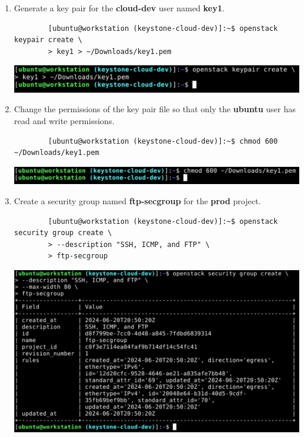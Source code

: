 \documentclass[letterpaper, 12pt]{article}
\begin{document}
\begin{enumerate}
    \item Generate a key pair for the \textbf{cloud-dev} user named \textbf{key1}.
    \begin{lstlisting}
        [ubuntu@workstation (keystone-cloud-dev)]:~$ openstack keypair create \
        > key1 > ~/Downloads/key1.pem
    \end{lstlisting}

    \begin{center}
        \includegraphics[width=\linewidth]{images/part1/step30.png}
    \end{center}

    \item Change the permissions of the key pair file so that only the \textbf{ubuntu} user has read and write permissions.
    \begin{lstlisting}
        [ubuntu@workstation (keystone-cloud-dev)]:~$ chmod 600 ~/Downloads/key1.pem
    \end{lstlisting}

    \begin{center}
        \includegraphics[width=\linewidth]{images/part1/step31.png}
    \end{center}

    \item Create a security group named \textbf{ftp-secgroup} for the \textbf{prod} project.
    \begin{lstlisting}
        [ubuntu@workstation (keystone-cloud-dev)]:~$ openstack security group create \
        > --description "SSH, ICMP, and FTP" \
        > ftp-secgroup
    \end{lstlisting}

    \begin{center}
        \includegraphics[width=\linewidth]{images/part1/step32.png}
    \end{center}


\end{enumerate}
\end{document}
